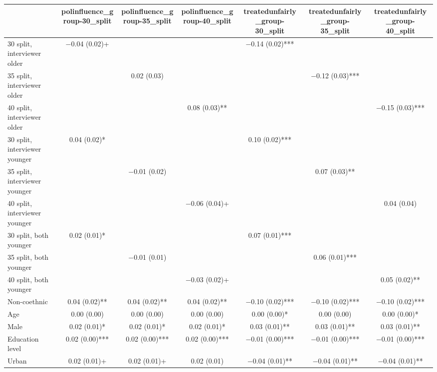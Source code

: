 \begin{table}[H]
\centering
\fontsize{7}{9}\selectfont
\begin{tabular}[t]{lcccccc}
\toprule
  & polinfluence\_group-30\_split & polinfluence\_group-35\_split & polinfluence\_group-40\_split & treatedunfairly\_group-30\_split & treatedunfairly\_group-35\_split & treatedunfairly\_group-40\_split\\
\midrule
30 split, interviewer older & \num{-0.04} (\num{0.02})+ &  &  & \num{-0.14} (\num{0.02})*** &  & \\
35 split, interviewer older &  & \num{0.02} (\num{0.03}) &  &  & \num{-0.12} (\num{0.03})*** & \\
40 split, interviewer older &  &  & \num{0.08} (\num{0.03})** &  &  & \num{-0.15} (\num{0.03})***\\
30 split, interviewer younger & \num{0.04} (\num{0.02})* &  &  & \num{0.10} (\num{0.02})*** &  & \\
35 split, interviewer younger &  & \num{-0.01} (\num{0.02}) &  &  & \num{0.07} (\num{0.03})** & \\
40 split, interviewer younger &  &  & \num{-0.06} (\num{0.04})+ &  &  & \num{0.04} (\num{0.04})\\
30 split, both younger & \num{0.02} (\num{0.01})* &  &  & \num{0.07} (\num{0.01})*** &  & \\
35 split, both younger &  & \num{-0.01} (\num{0.01}) &  &  & \num{0.06} (\num{0.01})*** & \\
40 split, both younger &  &  & \num{-0.03} (\num{0.02})+ &  &  & \num{0.05} (\num{0.02})**\\
Non-coethnic & \num{0.04} (\num{0.02})** & \num{0.04} (\num{0.02})** & \num{0.04} (\num{0.02})** & \num{-0.10} (\num{0.02})*** & \num{-0.10} (\num{0.02})*** & \num{-0.10} (\num{0.02})***\\
Age & \num{0.00} (\num{0.00}) & \num{0.00} (\num{0.00}) & \num{0.00} (\num{0.00}) & \num{0.00} (\num{0.00})* & \num{0.00} (\num{0.00}) & \num{0.00} (\num{0.00})*\\
Male & \num{0.02} (\num{0.01})* & \num{0.02} (\num{0.01})* & \num{0.02} (\num{0.01})* & \num{0.03} (\num{0.01})** & \num{0.03} (\num{0.01})** & \num{0.03} (\num{0.01})**\\
Education level & \num{0.02} (\num{0.00})*** & \num{0.02} (\num{0.00})*** & \num{0.02} (\num{0.00})*** & \num{-0.01} (\num{0.00})*** & \num{-0.01} (\num{0.00})*** & \num{-0.01} (\num{0.00})***\\
Urban & \num{0.02} (\num{0.01})+ & \num{0.02} (\num{0.01})+ & \num{0.02} (\num{0.01}) & \num{-0.04} (\num{0.01})** & \num{-0.04} (\num{0.01})** & \num{-0.04} (\num{0.01})**\\

\end{tabular}
\end{table}
